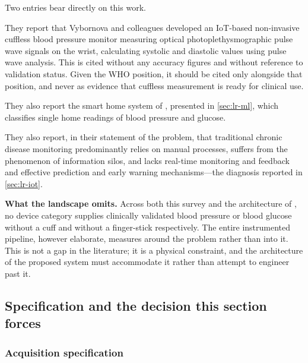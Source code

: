 \documentclass[12pt,a4paper,oneside]{report}
\begin{document}
Two entries bear directly on this work.

They report that Vybornova and colleagues developed an IoT-based non-invasive cuffless blood pressure monitor measuring optical photoplethysmographic pulse wave signals on the wrist, calculating systolic and diastolic values using pulse wave analysis. This is cited without any accuracy figures and without reference to validation status. Given the WHO position, it should be cited only alongside that position, and never as evidence that cuffless measurement is ready for clinical use.

They also report the smart home system of \textcite{chatrati2022}, presented in \cref{sec:lr-ml}, which classifies single home readings of blood pressure and glucose.

They also report, in their statement of the problem, that traditional chronic disease monitoring predominantly relies on manual processes, suffers from the phenomenon of information silos, and lacks real-time monitoring and feedback and effective prediction and early warning mechanisms---the diagnosis reported in \cref{sec:lr-iot}.

\textbf{What the landscape omits.} Across both this survey and the architecture of \textcite{efendi2025}, no device category supplies clinically validated blood pressure or blood glucose without a cuff and without a finger-stick respectively. The entire instrumented pipeline, however elaborate, measures around the problem rather than into it. This is not a gap in the literature; it is a physical constraint, and the architecture of the proposed system must accommodate it rather than attempt to engineer past it.

\subsection{Specification and the decision this section forces}\label{sec:spec21}

\subsubsection{Acquisition specification}
\end{document}
